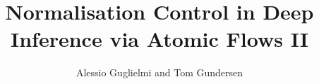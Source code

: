 \documentclass[a4paper,11pt]{article}
\author{Alessio Guglielmi and Tom Gundersen}
\title{Normalisation Control in Deep Inference via Atomic Flows II}
\begin{document}


\maketitle




%




\small

\end{document}
